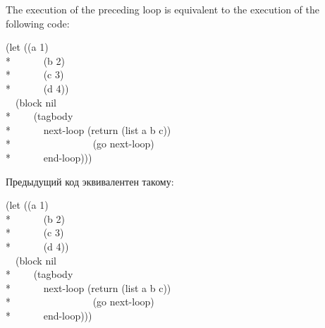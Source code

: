The execution of the preceding loop is equivalent to the execution of
the following code:

\begin{lisp}
(let ((a 1) \\*
~~~~~~(b 2) \\*
~~~~~~(c 3) \\*
~~~~~~(d 4)) \\
~~(block nil \\*
~~~~(tagbody \\*
~~~~~~next-loop (return (list a b c)) \\*
~~~~~~~~~~~~~~~~(go next-loop) \\*
~~~~~~end-loop)))
\end{lisp}

Предыдущий код эквивалентен такому:

\begin{lisp}
(let ((a 1) \\*
~~~~~~(b 2) \\*
~~~~~~(c 3) \\*
~~~~~~(d 4)) \\
~~(block nil \\*
~~~~(tagbody \\*
~~~~~~next-loop (return (list a b c)) \\*
~~~~~~~~~~~~~~~~(go next-loop) \\*
~~~~~~end-loop)))
\end{lisp}

